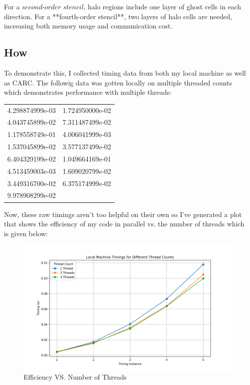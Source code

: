 \documentclass[12pt]{article}
\begin{document}
\noindent For a $\textit{second-order stencil}$, halo regions include one layer of ghost cells in each direction. For a **fourth-order stencil**, two layers of halo cells are needed, increasing both memory usage and communication cost.
\subsection{How}
To demonstrate this, I collected timing data from both my local machine as well as CARC. The followig data was gotten locally on multiple threaded counts which demonstrates performance with multiple threads:
\begin{table}[h]
    \centering
    \begin{tabular}{ll} %
        \toprule
        4.298874999e-03 & 1.724950000e-02 \\
        4.043745899e-02 & 7.311487499e-02 \\
        1.178558749e-01 & 4.006041999e-03 \\
        1.537045899e-02 & 3.577137499e-02 \\
        6.404329199e-02 & 1.049664169e-01 \\
        4.513459003e-03 & 1.609020799e-02 \\
        3.449316700e-02 & 6.375174999e-02 \\
        9.978908299e-02 & \\
        \bottomrule
    \end{tabular}
\end{table}

\newpage
\noindent Now, these raw timings aren't too helpful on their own so I've generated a plot that shows the efficiency of my code in parallel vs. the number of threads which is given below:

\begin{figure}[H]
    \centering
    \includegraphics[width=1.1\textwidth]{local_timings_plot.png}
    \caption{Efficiency VS. Number of Threads}
\end{figure}
\end{document}
